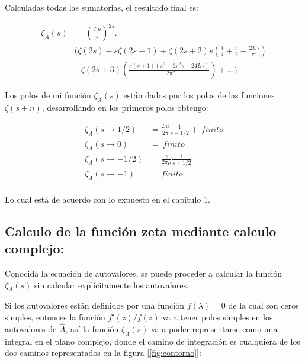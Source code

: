 Calculadas todas las sumatorias, el resultado final es:





\begin{equation}
\begin{aligned}
    \zeta _A (s) &= \left( \frac{L \mu }{\pi} \right) ^{2s} . \\[5pt]
	& \Bigg(
		\zeta ( 2 s ) -
		s \zeta ( 2s+1 ) +
		 \zeta (2s +2 ) s \left( \frac{1}{4} + \frac{s}{2} - \frac{2 L  \gamma}{\pi ^2} \right)  \\[5pt]
		 & - \zeta (2s+3) \left(  
							\frac{s(s+1) ( \pi ^2 + 2 \pi ^2 s - 24 L \gamma)}{12 \pi ^2 }
		 					\right) 
		+ ...
		\Bigg)
\end{aligned}
\end{equation}


Los polos de mi función $\zeta _A (s)$ están dados por los polos de las funciones $\zeta (s+n)$, desarrollando en los primeros polos obtengo:

\begin{equation}
\begin{aligned}
\zeta _A (s \rightarrow 1/2) &= 
\frac{L \mu }{2 \pi } \frac{1}{s-1/2} + \ finito \\[5pt]
\zeta _A (s \rightarrow 0) &= \ finito \\[5pt]
\zeta _A (s \rightarrow -1/2) &= \frac{\gamma}{2 \pi \mu } \frac{1}{s+1/2} \\[5pt]
\zeta _A (s \rightarrow -1) &= finito \\[5pt]
\end{aligned}
\end{equation}

Lo cual está de acuerdo con lo expuesto en el capítulo 1.

\subsection{Calculo de la función zeta mediante calculo complejo:}

Conocida la ecuación de autovalores, se puede proceder a calcular la función $\zeta _A (s) $ sin calcular explícitamente los autovalores.

Si los  autovalores están definidos por una función $f(\lambda ) = 0$ de la cual son ceros simples, entonces la función $f'(z) / f(z) $ va a tener polos simples en los autovalores de $\hat{A}$, así la  función $\zeta _A (s)$ va a poder representarse como una integral en el plano complejo, donde el camino de integración es cualquiera de los dos caminos representados en la figura [\ref{fig:contorno}]:

